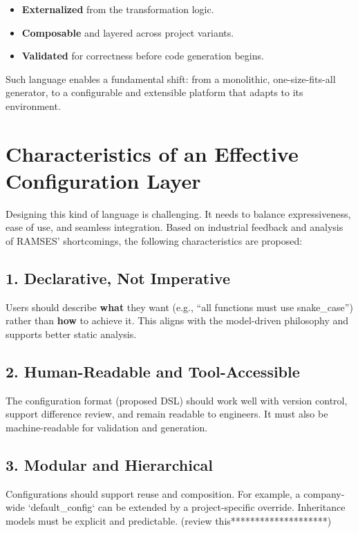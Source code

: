 \begin{itemize}
	\item \textbf{Externalized} from the transformation logic.
	\item \textbf{Composable} and layered across project variants.
	\item \textbf{Validated} for correctness before code generation begins.
\end{itemize}

Such language enables a fundamental shift: from a monolithic, one-size-fits-all generator, to a configurable and extensible platform that adapts to its environment.

\section{Characteristics of an Effective Configuration Layer}
\label{sec:config_language_characteristics}

Designing this kind of language is challenging. It needs to balance expressiveness, ease of use, and seamless integration. Based on industrial feedback and analysis of RAMSES’ shortcomings, the following characteristics are proposed:

\subsection*{1. Declarative, Not Imperative}

Users should describe \textbf{what} they want (e.g., “all functions must use snake\_case”) rather than \textbf{how} to achieve it. This aligns with the model-driven philosophy and supports better static analysis.

\subsection*{2. Human-Readable and Tool-Accessible}

The configuration format (proposed DSL) should work well with version control, support difference review, and remain readable to engineers. It must also be machine-readable for validation and generation.

\subsection*{3. Modular and Hierarchical}

Configurations should support reuse and composition. For example, a company-wide `default\_config` can be extended by a project-specific override. Inheritance models must be explicit and predictable. (review this********************)

